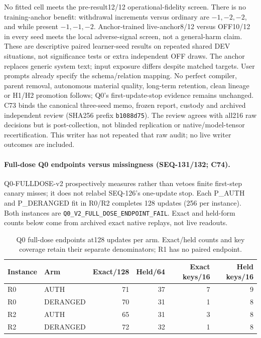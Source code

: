 \documentclass{article}
\begin{document}
No fitted cell meets the pre-result12/12 operational-fidelity screen. There is
no training-anchor benefit: withdrawal increments versus ordinary are $-1,-2,-2$,
and while present $-1,-1,-2$. Anchor-trained live-anchor8/12 versus OFF10/12 in
every seed meets the local adverse-signal screen, not a general-harm claim.
These are descriptive paired learner-seed results on repeated shared DEV
situations, not significance tests or extra independent OFF draws. The anchor
replaces generic system text; input exposure differs despite matched targets.
User prompts already specify the schema/relation mapping. No perfect compiler,
parent removal, autonomous material quality, long-term retention, clean lineage
or H1/H2 promotion follows; Q0's first-update-stop evidence remains unchanged.
C73 binds the canonical three-seed memo, frozen report, custody and archived
independent review (SHA256 prefix \texttt{b1088d75}). The review agrees with
all216 raw decisions but is post-collection, not blinded replication or
native/model-tensor recertification. This writer has not repeated that raw
audit; no live writer outcomes are included.

\paragraph{Full-dose Q0 endpoints versus missingness (SEQ-131/132; C74).}
Q0-FULLDOSE-v2 prospectively measures rather than vetoes finite first-step
canary misses; it does not relabel SEQ-126's one-update stop. Each P\_AUTH and
P\_DERANGED fit in R0/R2 completes 128 updates (256 per instance). Both instances
are \texttt{Q0\_V2\_FULL\_DOSE\_ENDPOINT\_FAIL}. Exact and held-form counts
below come from archived exact native replays, not live readouts.

\begin{table}[ht]
\centering
\caption{Q0 full-dose endpoints at128 updates per arm. Exact/held counts and
key coverage retain their separate denominators; R1 has no paired endpoint.}
\begin{tabular}{llrrrr}
\toprule
Instance & Arm & Exact/128 & Held/64 & Exact keys/16 & Held keys/16 \\
\midrule
R0 & AUTH & 71 & 37 & 7 & 9 \\
R0 & DERANGED & 70 & 31 & 1 & 8 \\
R2 & AUTH & 65 & 31 & 3 & 8 \\
R2 & DERANGED & 72 & 32 & 1 & 8 \\
\bottomrule
\end{tabular}
\end{table}
\end{document}
